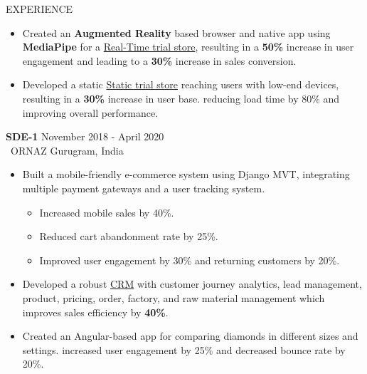 \documentclass{resume} %
\begin{document}
\begin{rSection}{EXPERIENCE}
\begin{itemize}
		\item Created an \textbf{Augmented Reality} based browser and native app using \textbf{MediaPipe} for a \href{https://www.ornaz.com/realtime-tryon/}{Real-Time trial store}, resulting in a \textbf{50\%} increase in user engagement and leading to a \textbf{30\%} increase in sales conversion. 
		\item Developed a static \href{https://www.ornaz.com/try-on-hand/?origin=iframe}{Static trial store} reaching users with low-end devices, resulting in a \textbf{30\%} increase in user base. reducing load time by 80\% and improving overall performance.
	\end{itemize}
		
	\textbf{SDE-1} \hfill November 2018 - April 2020\\
	\ ORNAZ \hfill Gurugram, India
	\begin{itemize}
		\itemsep -5pt {}
		\item Built a mobile-friendly e-commerce system using Django MVT, integrating multiple payment gateways and a user tracking system.
		      \begin{itemize}
		      	\itemsep -5pt {}
		      	\item Increased mobile sales by 40\%.
		      	\item Reduced cart abandonment rate by 25\%.
		      	\item Improved user engagement by 30\% and returning customers by 20\%.
		      \end{itemize}
		\item Developed a robust \href{https://www.ornaz.com/dashboard}{CRM} with customer journey analytics, lead management, product, pricing, order, factory, and raw material management which improves sales efficiency by \textbf{40\%}.
		\item Created an Angular-based app for comparing diamonds in different sizes and settings.
		      increased user engagement by 25\% and decreased bounce rate by 20\%.
	\end{itemize}
\end{rSection}

\end{document}
